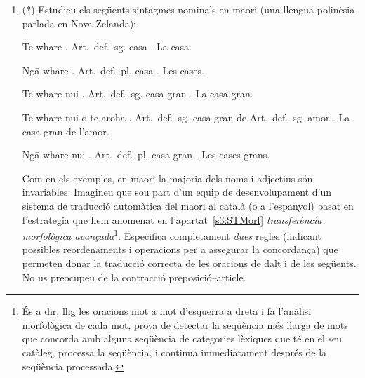 \begin{enumerate}
\item (*) Estudieu els següents sintagmes nominals en maori (una
  llengua polinèsia parlada en Nova Zelanda):

     \begin{example}
     \gll Te whare .
          \textsf{Art.\ def.\ sg.} casa .
     \glt La casa.
     \glend
     \end{example}

     \begin{example}
     \gll Ng\={a} whare  .
          \textsf{Art.\ def.\ pl.} casa .
     \glt Les cases.
     \glend
     \end{example}

     \begin{example}
     \gll Te whare nui .
          \textsf{Art.\ def.\ sg.} casa gran .
     \glt La casa gran.
     \glend
     \end{example}

     \begin{example}
     \gll Te whare nui o te aroha .
          \textsf{Art.\ def.\ sg.} casa gran de \textsf{Art.\ def.\
          sg.} amor .
     \glt La casa gran de l'amor.
     \glend
     \end{example}

     \begin{example}
     \gll Ng\={a} whare nui . 
          \textsf{Art.\ def.\ pl.} casa gran .
     \glt Les cases grans.
     \glend
     \end{example}
     
  Com en els exemples, en maori la majoria dels noms i adjectius són
  invariables.  Imagineu que sou part d'un equip de desenvolupament
  d'un sistema de traducció automàtica del maori al català (o a
  l'espanyol) basat en l'estrategia que hem anomenat en
  l'apartat~\ref{s3:STMorf} \emph{transferència morfològica
    avançada}\footnote{És a dir, llig les oracions mot a mot
    d'esquerra a dreta i fa l'anàlisi morfològica de cada mot, prova
    de detectar la seqüència més llarga de mots que concorda amb
    alguna seqüència de categories lèxiques que té en el seu catàleg,
    processa la seqüència, i continua immediatament després de la
    seqüència processada.}.  Especifica completament \emph{dues}
  regles (indicant possibles reordenaments i operacions per a
  assegurar la concordança) que permeten donar la traducció correcta
  de les oracions de dalt i de les següents.  No us preocupeu de la
  contracció preposició--article.


\end{enumerate}
